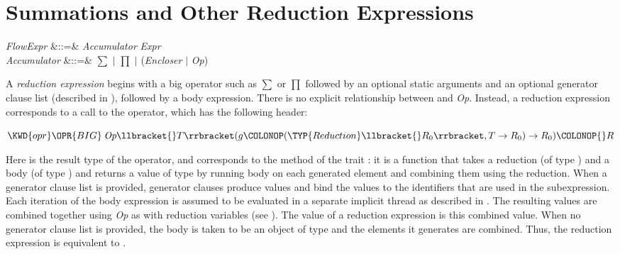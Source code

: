 %
%
%
%

\section{Summations and Other Reduction Expressions}

\begin{Grammar}
\emph{FlowExpr} &::=&
\emph{Accumulator} 
 \emph{Expr} \\

\emph{Accumulator} &::=& $\sum$ $|$ $\prod$ $|$  (\emph{Encloser} $|$ \emph{Op})
\end{Grammar}

A \emph{reduction expression} begins with a big operator such as
$\sum$ or $\prod$ followed by an optional static arguments and
an optional generator clause list (described in
), followed by a body expression.
There is no explicit relationship between  and
\emph{Op}.  Instead, a reduction expression corresponds to a call to the
 operator, which has the following header:
\begin{Fortress}
\(\KWD{opr} \mathord{\OPR{BIG}}\: \emph{Op}\llbracket{}T\rrbracket(g\COLONOP(\TYP{Reduction}\llbracket{}R_{0}\rrbracket,T\rightarrow{}R_{0})\rightarrow{}R_{0})\COLONOP{}R\)
\end{Fortress}
Here  is the result type of the operator, and  corresponds to
the method %
of the trait %
:
it is a function that takes a reduction (of type %
)
and a body (of type )
and returns a value of type  by running body on each
generated element and combining them using the reduction.
When a generator clause
list is provided, generator clauses produce values and bind the values to the
identifiers that are used in the subexpression.  Each iteration of the
body expression is assumed to be evaluated in a separate implicit
thread as described in .  The resulting values are
combined together using \emph{Op}
\label{redexpr-redvar}
as with reduction variables (see ).
The value of a reduction expression is this combined value.
When no generator clause list is provided, the body is taken to be an
object of type  and the elements it generates are
combined.  Thus, the reduction expression  is equivalent
to .

